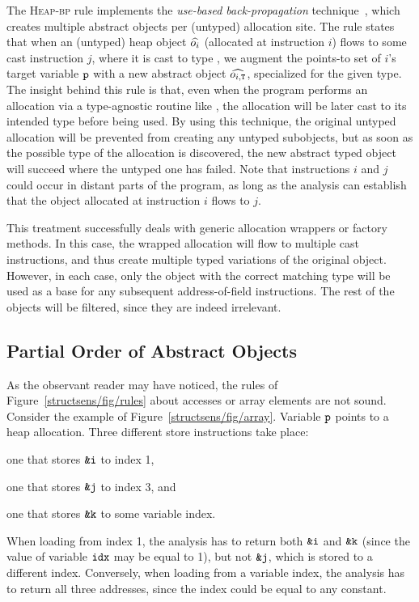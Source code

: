 The \textsc{Heap-bp} rule implements the \emph{use-based
back-propagation} technique~\cite{ecoop/LiTSX14,aplas/LivshitsWL05,aplas/SmaragdakisBKB15}, which creates multiple abstract
objects per (untyped) allocation site. The rule states that when an (untyped)
heap object $\widehat{o_i}$ (allocated at instruction $i$)
flows to some cast instruction $j$, where it is cast to type , we
augment the points-to set of $i$'s target variable $\texttt{p}$ with a
new abstract object $\widehat{o_{i,\texttt{T}}}$, specialized for the given
type. The insight behind this rule is that, even when the program
performs an allocation via a type-agnostic routine like
, the allocation will be later cast to its intended
type before being used. By using this technique, the original untyped
allocation will be prevented from creating any untyped subobjects, but
as soon as the possible type of the allocation is discovered, the new
abstract typed object will succeed where the untyped one has failed.
Note that instructions $i$ and $j$ 
could occur in distant parts of the program, as long as the analysis
can establish that the object allocated at instruction $i$ flows to
$j$.

This treatment successfully deals with generic
allocation wrappers or factory methods. In this case, the wrapped
allocation will flow to multiple cast instructions, and thus create
multiple typed variations of the original object. However, in each
case, only the object with the correct matching type will be used as a
base for any subsequent address-of-field instructions.
The rest of the objects will be filtered, since they are
indeed irrelevant.


\subsection{Partial Order of Abstract Objects}

As the observant reader may have noticed, the rules of
Figure~\ref{structsens/fig/rules} about accesses or array elements are
not sound. Consider the example of
Figure~\ref{structsens/fig/array}. Variable $\texttt{p}$ points to a heap
allocation. Three different store instructions take place:
\begin{inparaenum}[(i)]
\item one that stores $\texttt{\&i}$ to index 1,
\item one that stores $\texttt{\&j}$ to index 3, and
\item one that stores $\texttt{\&k}$ to some variable index.
\end{inparaenum}
When loading from index 1, the analysis has to return both
$\texttt{\&i}$ and $\texttt{\&k}$ (since the value of variable $\texttt{idx}$
may be equal to 1), but not $\texttt{\&j}$, which is stored to a
different index. Conversely, when loading from a variable index, the
analysis has to return all three addresses, since the index could be
equal to any constant.

